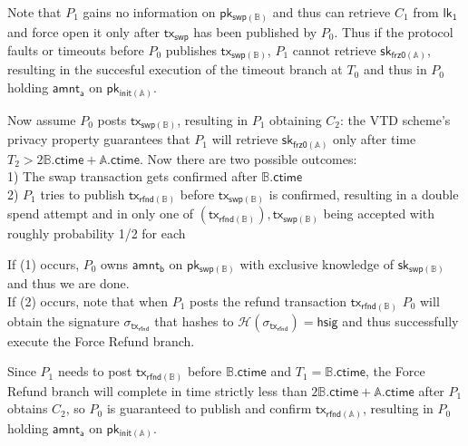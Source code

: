 \documentclass{article}      	%
\begin{document}
Note that $P_1$ gains no information on $\mathsf{pk_{swp(\mathbb{B})}}$ and thus can retrieve $C_1$ from $\mathsf{lk_1}$ and force open it only after $\mathsf{tx_{swp}}$ has been published by $P_0$. Thus if the protocol faults or timeouts before $P_0$ publishes $\mathsf{tx_{swp(\mathbb{B})}}$, $P_1$ cannot retrieve $\mathsf{sk_{frz0(\mathbb{A})}}$, resulting in the succesful execution of the timeout branch at $T_0$ and thus in $P_0$ holding $\mathsf{amnt_a}$ on $\mathsf{pk_{init(\mathbb{A})}}$. 

Now assume $P_0$ posts $\mathsf{tx_{swp(\mathbb{B})}}$, resulting in $P_1$ obtaining $C_2$: the VTD scheme's privacy property guarantees that $P_1$ will retrieve $\mathsf{sk_{frz0(\mathbb{A})}}$ only after time $T_2 > 2\mathbb{B}.\mathsf{ctime}  + \mathbb{A}.\mathsf{ctime}$. Now there are two possible outcomes: \\
1) The swap transaction gets confirmed after $\mathbb{B}.\mathsf{ctime}$  \\
2) $P_1$ tries to publish $\mathsf{tx_{rfnd(\mathbb{B})}}$ before $\mathsf{tx_{swp(\mathbb{B})}}$ is confirmed, resulting in a double spend attempt and in only one of $(\mathsf{tx_{rfnd(\mathbb{B})}}), \mathsf{tx_{swp(\mathbb{B})}}$ being accepted with roughly probability 1/2 for each

If (1) occurs, $P_0$ owns $\mathsf{amnt_b}$ on $\mathsf{pk_{swp(\mathbb{B})}}$ with exclusive knowledge of $\mathsf{sk_{swp(\mathbb{B})}}$ and thus we are done. \\
If (2) occurs, note that when $P_1$ posts the refund transaction $\mathsf{tx_{rfnd(\mathbb{B})}}$ $P_0$ will obtain the signature $\sigma_{\mathsf{tx_{rfnd}}}$ that hashes to $\mathcal{H}(\sigma_{\mathsf{tx_{rfnd}}}) = \mathsf{hsig}$  and thus successfully execute the Force Refund branch.

Since $P_1$ needs to post $\mathsf{tx_{rfnd(\mathbb{B})}}$ before $\mathbb{B}.\mathsf{ctime}$ and $T_1 = \mathbb{B}.\mathsf{ctime}$, the Force Refund branch will complete in time strictly less than $2\mathbb{B}.\mathsf{ctime} + \mathbb{A}.\mathsf{ctime}$ after $P_1$ obtains $C_2$, so $P_0$ is guaranteed to publish and confirm $\mathsf{tx_{rfnd(\mathbb{A})}}$, resulting in $P_0$ holding $\mathsf{amnt_a}$ on $\mathsf{pk_{init(\mathbb{A})}}$.
\end{document}
